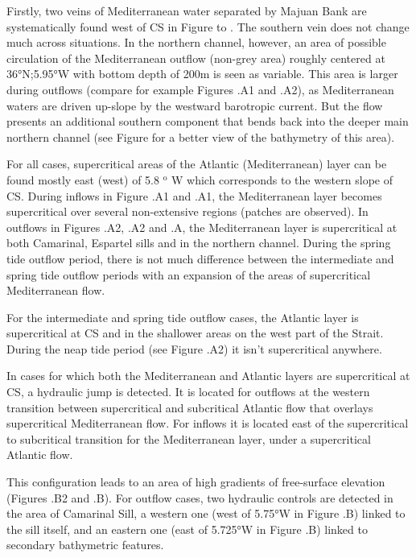 Firstly, two veins of Mediterranean water separated by Majuan Bank are systematically found west of CS in Figure  to .
The southern vein does not change much across situations. In the northern channel, however, an area of possible circulation of the Mediterranean outflow (non-grey area) roughly centered at 36°N;5.95°W with bottom depth of 200m is seen as variable. This area is larger during outflows (compare for example Figures .A1 and .A2), as Mediterranean waters are driven up-slope by the westward barotropic current. But the flow presents an additional southern component that bends back into the deeper main northern channel (see Figure  for a better view of the bathymetry of this area).

For all cases, supercritical areas of the Atlantic (Mediterranean) layer can be found mostly east (west) of 5.8 $^\text{o}$ W which corresponds to the western slope of CS. During inflows in Figure .A1 and .A1, the Mediterranean layer becomes supercritical over several non-extensive regions (patches are observed). In outflows in Figures .A2, .A2 and .A, the Mediterranean layer is supercritical at both Camarinal, Espartel sills and in the northern channel. During the spring tide outflow period, there is not much difference between the intermediate and spring tide outflow periods with an expansion of the areas of supercritical Mediterranean flow.

For the intermediate and spring tide outflow cases, the Atlantic layer is supercritical at CS and in the shallower areas on the west part of the Strait. During the neap tide period (see Figure .A2) it isn't supercritical anywhere. 

In cases for which both the Mediterranean and Atlantic layers are supercritical at CS, a hydraulic jump is detected. It is located for outflows at the western transition between supercritical and subcritical Atlantic flow that overlays supercritical Mediterranean flow. For inflows it is located east of the supercritical to subcritical transition for the Mediterranean layer, under a supercritical Atlantic flow.

This configuration leads to an area of high gradients of free-surface elevation (Figures .B2 and .B). For outflow cases, two hydraulic controls are detected in the area of Camarinal Sill, a western one (west of 5.75°W in Figure .B) linked to the sill itself, and an eastern one (east of 5.725°W in Figure .B) linked to secondary bathymetric features.

